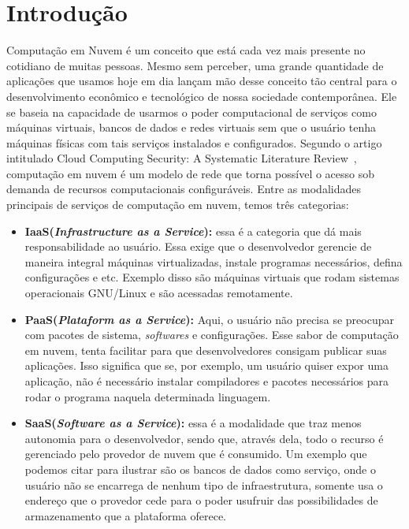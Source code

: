 \documentclass[11pt,twoside]{article}
\begin{document}
\section{Introdução}

Computação em Nuvem é um conceito que está cada vez mais presente no cotidiano de muitas pessoas. Mesmo sem perceber, uma grande quantidade de aplicações que usamos hoje 
em dia lançam mão desse conceito tão central para o desenvolvimento econômico e tecnológico de nossa sociedade contemporânea. Ele se baseia na capacidade de usarmos o
poder computacional de serviços como máquinas virtuais, bancos de dados e redes virtuais sem que o usuário tenha máquinas físicas com tais serviços 
instalados e configurados. Segundo o artigo intitulado Cloud Computing Security: A
Systematic Literature Review~\cite{UPP}, computação em nuvem é um modelo de rede que torna possível o acesso sob demanda de recursos computacionais configuráveis.
Entre as modalidades principais de serviços de computação em nuvem, temos três categorias:

\begin{itemize}

  \item \textbf{IaaS(\emph{Infrastructure as a Service}):} essa é a categoria que dá mais responsabilidade ao usuário. Essa exige que o desenvolvedor gerencie de maneira integral máquinas virtualizadas, 
  instale programas necessários, defina configurações e etc. Exemplo disso são máquinas virtuais que rodam sistemas operacionais GNU/Linux e são acessadas remotamente.
  \item \textbf{PaaS(\emph{Plataform as a Service}):} Aqui, o usuário não precisa se preocupar com pacotes de sistema, \emph{softwares} e configurações. Esse sabor de computação em nuvem, tenta 
  facilitar para que desenvolvedores consigam publicar suas aplicações. Isso significa que se, por exemplo, um usuário quiser expor uma aplicação, não é necessário
  instalar compiladores e pacotes necessários para rodar o programa naquela determinada linguagem.
  \item \textbf{SaaS(\emph{Software as a Service}):} essa é a modalidade que traz menos autonomia para o desenvolvedor, sendo que, através dela, todo o recurso é gerenciado pelo provedor de 
  nuvem que é consumido. Um exemplo que podemos citar para ilustrar são os bancos de dados como serviço, onde o usuário não se encarrega de nenhum tipo de infraestrutura, 
  somente usa o endereço que o provedor cede para o poder usufruir das possibilidades de armazenamento que a plataforma oferece.

\end{itemize}
\end{document}
